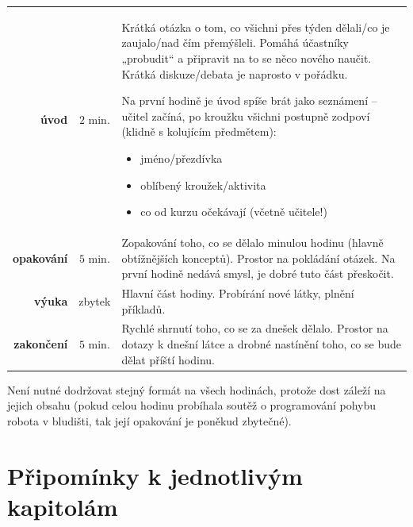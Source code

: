 \begin{table}[h!]
	\begin{tabularx}{\textwidth}{rc>{\setlength{\parskip}{0.5\baselineskip}}X} \toprule
		\textbf{úvod} & $2$ min. & Krátká otázka o tom, co všichni přes týden dělali/co je zaujalo/nad čím přemýšleli. Pomáhá účastníky „probudit“ a připravit na to se něco nového naučit. Krátká diskuze/debata je naprosto v pořádku.

		Na první hodině je úvod spíše brát jako seznámení -- učitel začíná, po kroužku všichni postupně zodpoví (klidně s kolujícím předmětem):
		\begin{itemize}[label=\textbullet, leftmargin=20pt,
							after*={\mbox{}\vspace{-\baselineskip}}]
			\item jméno/přezdívka
			\item oblíbený kroužek/aktivita
			\item co od kurzu očekávají (včetně učitele!)
		\end{itemize}
		\\
		\noalign{\vspace{8pt}}
		\textbf{opakování} & $5$ min. & Zopakování toho, co se dělalo minulou hodinu (hlavně obtížnějších konceptů). Prostor na pokládání otázek. Na první hodině nedává smysl, je dobré tuto část přeskočit. \\
		\noalign{\vspace{8pt}}
		\textbf{výuka} & zbytek &  Hlavní část hodiny. Probírání nové látky, plnění příkladů. \\
		\noalign{\vspace{8pt}}
		\textbf{zakončení} & $5$ min. & Rychlé shrnutí toho, co se za dnešek dělalo. Prostor na dotazy k dnešní látce a drobné nastínění toho, co se bude dělat příští hodinu. \\
		\bottomrule
	\end{tabularx}
\end{table}

Není nutné dodržovat stejný formát na všech hodinách, protože dost záleží na jejich obsahu (pokud celou hodinu probíhala soutěž o programování pohybu robota v bludišti, tak její opakování je poněkud zbytečné).

\newpage

\section{Připomínky k jednotlivým kapitolám}

\setcounter{secnumdepth}{3}

